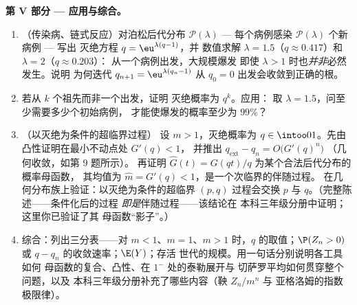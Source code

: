 \begin{problem}
\medskip
\noindent\textbf{第 V 部分 --- 应用与综合。}
\begin{enumerate}[resume]
  \item （传染病、链式反应）对泊松后代分布
        $\mathcal P(\lambda)$ --- 每个病例感染
        $\mathcal P(\lambda)$ 个新病例 --- 写出
        灭绝方程 $q = \eu^{\lambda(q-1)}$，并
        数值求解 $\lambda = 1.5$（$q \approx
        0.417$）和 $\lambda = 2$（$q \approx 0.203$）：
        从一个病例出发，大规模爆发
        即使 $\lambda > 1$ 时也\emph{并非}必然发生。说明
        为何迭代 $q_{n+1} = \eu^{\lambda(q_n - 1)}$
        从 $q_0 = 0$ 出发会收敛到正确的根。
  \item 若从 $k$ 个祖先而非一个出发，证明
        灭绝概率为 $q^k$。应用：
        取 $\lambda = 1.5$，问至少需要多少个初始病例，
        才能使爆发的概率至少为 $99\%$？
  \item （以灭绝为条件的超临界过程）
        设 $m > 1$，灭绝概率为 $q \in
        \intoo01$。先由凸性证明在最小不动点处 $G'(q) < 1$，
        并推出
        $q_{\mathrm{ext}} - q_n = O\bigl(G'(q)^n\bigr)$
        （几何收敛，如第 9 题所示）。
        再证明 $\widehat G(t) = G(qt)/q$ 为某个合法后代分布的概率母函数，
        其均值为 $\widehat m =
        G'(q) < 1$，是一个次临界的伴随过程。
        在几何分布族上验证：以灭绝为条件的超临界
        $(p, q)$ 过程会交换
        $p$ 与 $q$。（完整陈述——条件化后的过程
        \emph{即是}伴随过程——该结论在
        本科三年级分册中证明；这里你已验证了其
        母函数“影子”。）
  \item 综合：列出三分表——对 $m <
        1$、$m = 1$、$m > 1$ 时，$q$ 的取值；$\P(Z_n >
        0)$ 或 $q - q_n$ 的收敛速率；$\E(Y)$；存活
        世代的规模。用一句话分别说明各工具如何
        母函数的复合、凸性、在 $1^-$ 处的泰勒展开与
        切萨罗平均如何贯穿整个问题，以及
        本科三年级分册补充了哪些内容（鞅 $Z_n/m^n$ 与
        亚格洛姆的指数极限律）。
\end{enumerate}
\end{problem}
